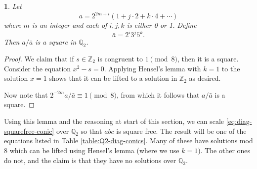 \documentclass[10pt,a4paper]{amsart}
\numberwithin{equation}{section}
\numberwithin{figure}{section}
\numberwithin{table}{section}
\theoremstyle{definition}
\theoremstyle{plain}
\theoremstyle{remark}
\theoremstyle{plain}
\theoremstyle{definition}
\theoremstyle{plain}
\theoremstyle{plain}
\newtheorem{lem}[thm]{\protect\lemmaname}
\providecommand{\lemmaname}{Lemma}
\newcommand{\Z}{\mathbb{Z}}
\newcommand{\Q}{\mathbb{Q}}
\begin{document}
	\begin{lem}\label{lem:squares-in-Q2}
		Let
		\[
			a = 2^{2m + i}(1 + j\cdot 2 + k \cdot 4+ \cdots)
		\]
		where $m$ is an integer and each of $i,j,k$ is either 0 or 1. Define
		\[
			\bar{a} = 2^i 3^j 5^k.
		\]
		Then $a/\bar{a}$ is a square in $\Q_2$.
	\end{lem}
	\begin{proof}
		We claim that if $s\in \Z_2$ is congruent to $1\pmod 8$, then it is a square. Consider the equation $x^2 - s=0$. Applying Hensel's lemma with $k=1$ to the solution $x = 1$ shows that it can be lifted to a solution in $\Z_2$ as desired.
		
		Now note that $2^{-2m} a/\bar{a} \equiv 1 \pmod 8$, from which it follows that $a/\bar{a}$ is a square.
	\end{proof}
	Using this lemma and the reasoning at start of this section, we can scale \eqref{eq:diag-squarefree-conic} over $\Q_2$ so that $abc$ is square free. The result will be one of the equations listed in Table \ref{table:Q2-diag-conics}. Many of these have solutions mod 8 which can be lifted using Hensel's lemma (where we use $k=1$). The other ones do not, and the claim is that they have no solutions over $\Q_2$.
	
\end{document}
